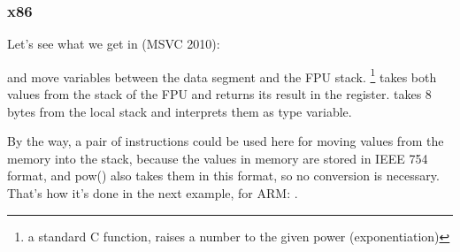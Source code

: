 \subsubsection{x86}

Let's see what we get in (MSVC 2010):




\FLD and \FSTP move variables between the data segment and the FPU stack. 
\footnote{a standard C function, raises a number to the given power (exponentiation)}
takes both values from the stack of the FPU and 
returns its result in the  register.
\printf takes 8 bytes from the local stack and interprets them as \Tdouble type variable.

By the way, a pair of \MOV instructions could be used here for moving values from the memory
into the stack, because the values in memory are stored in IEEE 754 format, and pow() also takes them in this
format, so no conversion is necessary.
That's how it's done in the next example, for ARM: .

